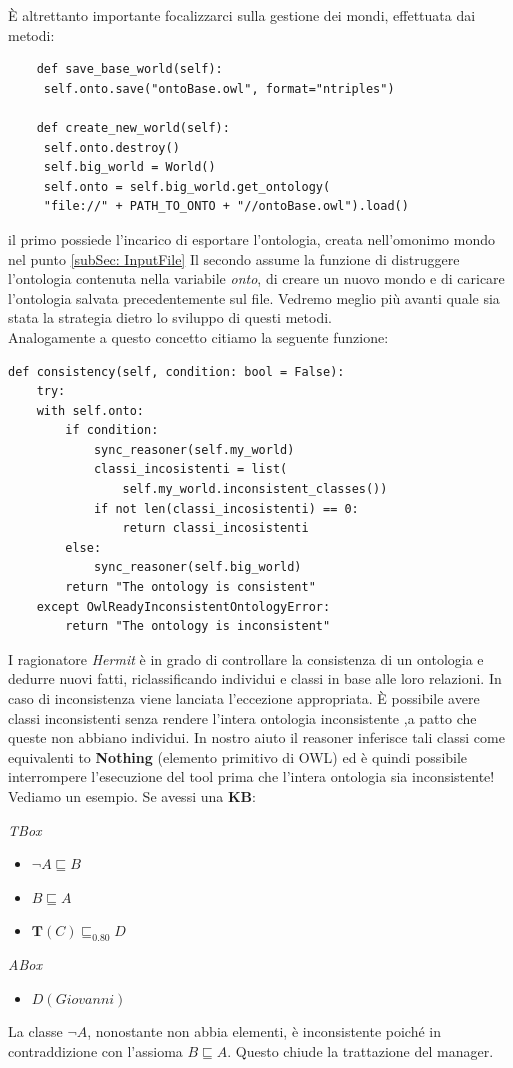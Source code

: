È altrettanto importante focalizzarci sulla gestione dei mondi, effettuata dai metodi:
\begin{verbatim}
	def save_base_world(self):
	 self.onto.save("ontoBase.owl", format="ntriples")
	
	def create_new_world(self):
	 self.onto.destroy()
	 self.big_world = World()
	 self.onto = self.big_world.get_ontology(
	 "file://" + PATH_TO_ONTO + "//ontoBase.owl").load() 
\end{verbatim}
il primo possiede l'incarico di esportare l'ontologia, creata nell'omonimo mondo nel punto 
\ref{subSec: InputFile}
Il secondo assume la funzione di distruggere l'ontologia contenuta nella variabile \textit{onto}, 
di creare un nuovo mondo e di caricare l'ontologia salvata precedentemente sul file.
Vedremo meglio più avanti quale sia stata la strategia dietro lo sviluppo di questi metodi.\\
Analogamente a questo concetto citiamo la seguente funzione:
\begin{verbatim}
def consistency(self, condition: bool = False):
	try:
	with self.onto:
		if condition:
			sync_reasoner(self.my_world)
			classi_incosistenti = list(
 				self.my_world.inconsistent_classes())
			if not len(classi_incosistenti) == 0:
 				return classi_incosistenti
		else:
			sync_reasoner(self.big_world)
   		return "The ontology is consistent"
	except OwlReadyInconsistentOntologyError:
 		return "The ontology is inconsistent"
\end{verbatim}
I ragionatore \emph{Hermit} è in grado di controllare la consistenza di un ontologia e dedurre nuovi fatti,
riclassificando individui e classi in base alle loro relazioni. In caso di inconsistenza viene lanciata
l'eccezione appropriata. È possibile avere classi inconsistenti senza rendere l'intera ontologia
inconsistente ,a patto che queste non abbiano individui. In nostro aiuto il reasoner inferisce tali classi
come equivalenti to \textbf{Nothing} (elemento primitivo di OWL) ed è quindi possibile interrompere 
l'esecuzione del tool prima che l'intera ontologia sia inconsistente!
Vediamo un esempio. Se avessi una \textbf{KB}:
\begin{multicols}{2}
	\textit{TBox}
	\begin{itemize}
		\item $ \neg A \sqsubseteq B $
		\item $ B \sqsubseteq A $
		\item $ \mathbf{T}(C) \sqsubseteq_{0.80} D $
	\end{itemize}
	\columnbreak
	\textit{ABox}
	\begin{itemize}
		\item $ D(Giovanni) $
	\end{itemize}
\end{multicols}
La classe $ \neg A $, nonostante non abbia elementi, è inconsistente poiché in contraddizione con
l'assioma $ B \sqsubseteq A $. Questo chiude la trattazione del manager.

